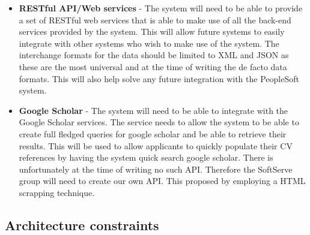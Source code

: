 \documentclass[12pt]{article}
\begin{document}
\begin{itemize}
	\item \textbf{RESTful API/Web services} - The system will need to be able to provide a set of RESTful web services that is able to make use of all the back-end services provided by the system. This will allow future systems to easily integrate with other systems who wish to make use of the system. The interchange formats for the data should be limited to XML and JSON as these are the most universal and at the time of writing the de facto data formats. This will also help solve any future integration with the PeopleSoft system.
	\item \textbf{Google Scholar} - The system will need to be able to integrate with the Google Scholar services. The service needs to allow the system to be able to create full fledged queries for google scholar and be able to retrieve their results. This will be used to allow applicants to quickly populate their CV references by having the system quick search google scholar. There is unfortunately at the time of writing no such API. Therefore the SoftServe group will need to create our own API. This proposed by employing a HTML scrapping technique. 
\end{itemize} 

\vspace{0.2in}

\subsection{Architecture constraints}
\vspace{0.2in}
\end{document}
